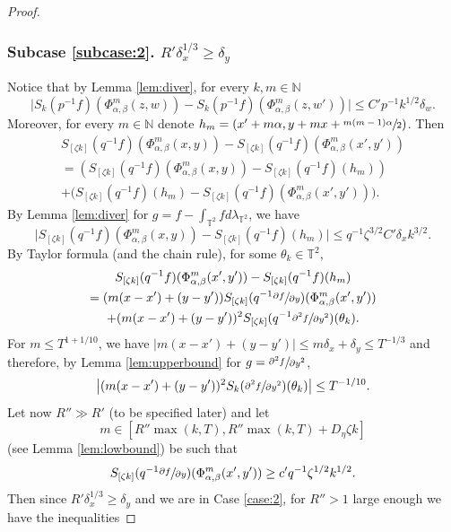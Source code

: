 \documentclass[JEP,XML,SOM,Unicode,NoEqCountersInSection]{cedram}
\newcounter{case}
\newcounter{subcase}
\theoremstyle{definition}
\theoremstyle{plain}
\newcommand\NN{\mathbb{N}}
\newcommand\TT{\mathbb{T}}
\begin{document}
\begin{proof}
\subsubsection*{Subcase \ref{subcase:2}. $R'\delta_x^{1/3}\geq \delta_y$}
Notice that by Lemma \ref{lem:diver}, for every $k, m\in \NN$
\begin{equation}\label{eq:02}
\bigl|S_k(p^{-1}f)(\Phi_{\alpha,\beta}^m(z,w))-S_k(p^{-1}f)(\Phi_{\alpha,\beta}^m(z,w'))\bigr|\leq C'p^{-1}k^{1/2}\delta_w.
\end{equation}
Moreover, for every $m\in \NN$ denote $h_m=(x'+m\alpha, y+mx+\sfrac{m(m-1)\alpha}{2})$. Then
\begin{multline}\label{sar:split2}
S_{[\zeta k]}(q^{-1}f)(\Phi_{\alpha,\beta}^m(x,y))-S_{[\zeta k]}(q^{-1}f)
(\Phi_{\alpha,\beta}^m(x',y'))\\ =
\left(S_{[\zeta k]}(q^{-1}f)(\Phi_{\alpha,\beta}^m(x,y))-S_{[\zeta k]}(q^{-1}f)(h_m)\right)\\ +
\bigl(S_{[\zeta k]}(q^{-1}f)(h_m)-S_{[\zeta k]}(q^{-1}f)(\Phi_{\alpha,\beta}^m(x',y'))\bigr).
\end{multline}
By Lemma \ref{lem:diver} for $g=f-\int_{\TT^2} f d\lambda_{\TT^2}$, we have
\begin{equation}\label{eq:01}
\bigl|S_{[\zeta k]}(q^{-1}f)(\Phi_{\alpha,\beta}^m(x,y))-S_{[\zeta k]}(q^{-1}f)(h_m)\bigr|\leq q^{-1}\zeta^{3/2}C' \delta_x k^{3/2}.
\end{equation}
By Taylor formula (and the chain rule), for some $\theta_k\in \TT^2$,
\begin{multline}\label{eq:sply}
S_{[\zeta k]}(q^{-1}f)(\Phi_{\alpha,\beta}^m(x',y'))-S_{[\zeta k]}(q^{-1}f)(h_m) \\
=(m(x-x')+(y-y'))S_{[\zeta k]}(q^{-1}\sfrac{\partial f}{\partial y})(\Phi_{\alpha,\beta}^m(x',y'))\\
+(m(x-x')+(y-y'))^2 S_{[\zeta k]}(q^{-1}\sfrac{\partial^2 f}{\partial y^2})(\theta_k).
\end{multline}
For $m\leq T^{1+1/10}$, we have $\vert m(x-x')+(y-y')\vert \leq m\delta_x +\delta_y \leq T^{-1/3}$ and therefore, by Lemma \ref{lem:upperbound} for $g=\sfrac{\partial^2 f}{\partial y^2}$,
\[
\bigl|(m(x-x')+(y-y'))^2
S_k(\sfrac{\partial^2 f}{\partial y^2})(\theta_k)\bigr|\leq T^{-1/10}.
\]
Let now $R''\gg R'$ (to be specified later) and let
\[
m\in [R''\max(k,T ),R''\max(k,T)+D_\eta \zeta k]
\]
(see Lemma \ref{lem:lowbound}) be such that
\[
S_{[\zeta k]}(q^{-1}\sfrac{\partial f}{\partial y})(\Phi_{\alpha,\beta}^m(x',y'))\geq c'q^{-1}\zeta^{1/2} k^{1/2}.
\]
Then since $R'\delta_x^{1/3}\geq \delta_y$ and we are in Case \ref{case:2}, for $R''>1$ large enough we have the inequalities

\end{proof}
\end{document}
